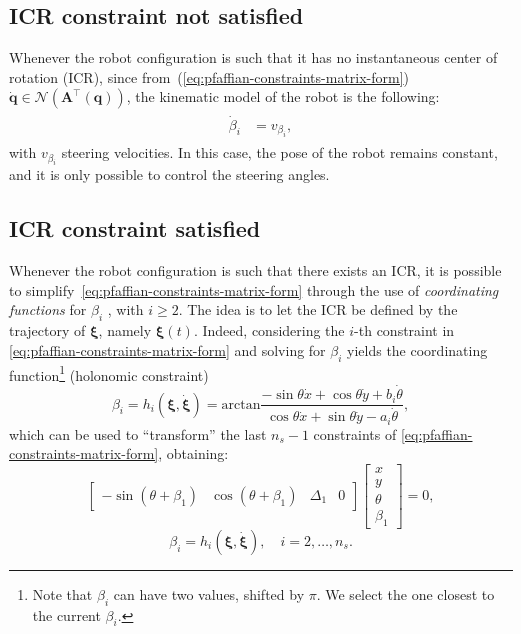 \subsection{ICR constraint not satisfied}
Whenever the robot configuration is such that it has no instantaneous center
of rotation (ICR), since from~(\ref{eq:pfaffian-constraints-matrix-form})
$\dot{\bm{q}} \in \mathcal{N}(\bm{A}^\top(\bm{q}))$, the kinematic model of
the robot is the following:
\begin{align*}
\begin{split}
    \dot{\beta}_i &= v_{\beta_i},
\end{split}
\end{align*}
with $v_{\beta_i}$ steering velocities. In this case, the pose of the robot
remains constant, and it is only possible to control the steering angles. 

\subsection{ICR constraint satisfied}
\label{sec:icr-constraint-satisfied}
Whenever the robot configuration is such that there exists an ICR,
it is possible to simplify~\eqref{eq:pfaffian-constraints-matrix-form}
through the use of \textit{coordinating functions} for $\beta_i$
\cite{RobuffoGiordano2009ICRA}, with $i \ge 2$. The idea is to let the ICR
be defined by the trajectory of $\bm{\xi}$, namely $\bm{\xi} \left( t \right)$.
Indeed, considering the $i$-th constraint in
\eqref{eq:pfaffian-constraints-matrix-form} and solving for $\beta_i$ yields
the coordinating function\footnote{Note that $\beta_i$ can have two values,
shifted by $\pi$. We select the one closest to the current $\beta_i$.}
(holonomic constraint)
\begin{equation}
    \label{eq:coordinating-function-pre-kinematic-model}
    \beta_i = h_i(\bm{\xi}, \dot{\bm{\xi}}) = \mathrm{arctan} \frac{-\sin\theta\dot{x}+\cos\theta\dot{y}+b_i\dot{\theta}}{\cos\theta\dot{x}+\sin\theta\dot{y}-a_i\dot{\theta}},
\end{equation}
which can be used to ``transform'' the last $n_s-1$ constraints of
\eqref{eq:pfaffian-constraints-matrix-form}, obtaining:
\begin{equation}
    \label{eq:reduced-pfaffian-constraints-matrix-form}
    \begin{bmatrix}
        -\sin(\theta + \beta_1) &
        \cos(\theta + \beta_1) &
        \Delta_1 &
        0
    \end{bmatrix}
    \begin{bmatrix}
        x \\ y \\ \theta \\ \beta_1
    \end{bmatrix}
    = 0,
\end{equation}
\begin{equation*}
    \beta_i = h_i(\bm{\xi}, \dot{\bm{\xi}}), \quad i = 2, \dots, n_s.
\end{equation*}


